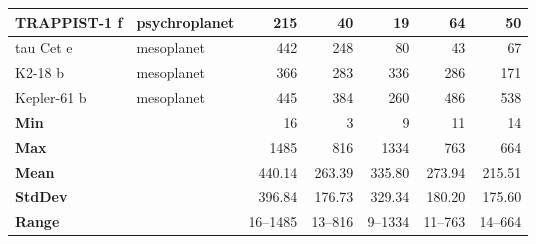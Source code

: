 \documentclass[fleqn,usenatbib]{mnras}
\begin{document}
\begin{table*}
{\begin{tabular}{|l|l|r|r|r|r|r|}
TRAPPIST-1 f         & psychroplanet                                 & 215                                                                 & 40                                   & 19                                 & 64                                    & 50                                 \\ \hline
tau Cet e            & mesoplanet                                     & 442                                                              & 248                                  & 80                                 & 43                                    & 67                                 \\ \hline
K2-18 b     & mesoplanet                                    & 366                                                      & 283                                  & 336                                & 286                                   & 171                                \\ \hline
Kepler-61 b & mesoplanet                                    & 445                                                       & 384                                  & 260                                & 486                                   & 538                                \\ \hline
\textbf{Min}    &                & 16 & 3          & 9      & 11     & 14              \\ \hline
\textbf{Max}    &      & 1485           & 816    & 1334   & 763    & 664            \\ \hline
\textbf{Mean}   &            & 440.14       & 263.39 & 335.80 & 273.94 & 215.51 \\ \hline
\textbf{StdDev} &   & 396.84       & 176.73 & 329.34 & 180.20 & 175.60         \\ \hline
\textbf{Range}  &   & 16--1485      & 13--816 & 9--1334 & 11--763 & 14--664         \\ \hline
\end{tabular}
}
\end{table*}
\end{document}
